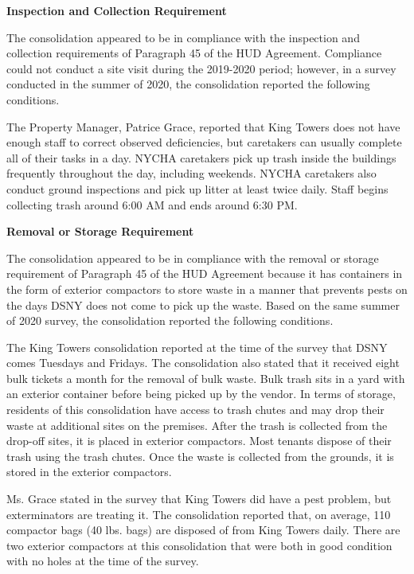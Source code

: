 

\textbf{Inspection and Collection Requirement} 

 

The consolidation appeared to be in compliance with the inspection and collection requirements of Paragraph 45 of the HUD Agreement. Compliance could not conduct a site visit during the 2019-2020 period; however, in a survey conducted in the summer of 2020, the consolidation reported the following conditions.

The Property Manager, Patrice Grace, reported that King Towers does not have enough staff to correct observed deficiencies, but caretakers can usually complete all of their tasks in a day. NYCHA caretakers pick up trash inside the buildings frequently throughout the day, including weekends. NYCHA caretakers also conduct ground inspections and pick up litter at least twice daily. Staff begins collecting trash around 6:00 AM and ends around 6:30 PM.

\textbf{Removal or Storage Requirement} 

The consolidation appeared to be in compliance with the removal or storage requirement of Paragraph  45 of the HUD Agreement because it has containers in the form of exterior compactors to store waste in a manner that prevents pests on the days DSNY does not come to pick up the waste. Based on the same summer of  2020 survey, the consolidation reported the following conditions.  

The King Towers consolidation reported at the time of the survey that DSNY comes Tuesdays and Fridays. The consolidation also stated that it received eight bulk tickets a month for the removal of bulk waste. Bulk trash sits in a yard with an exterior container before being picked up by the vendor. In terms of storage, residents of this consolidation have access to trash chutes and may drop their waste at additional sites on the premises. After the trash is collected from the drop-off sites, it is placed in exterior compactors. Most tenants dispose of their trash using the trash chutes. Once the waste is collected from the grounds, it is stored in the exterior compactors.  

 

Ms. Grace stated in the survey that King Towers did have a pest problem, but exterminators are treating it. The consolidation reported that, on average, 110 compactor bags (40 lbs. bags)  are disposed of from King Towers daily. There are two exterior compactors at this consolidation that were both in good condition with no holes at the time of the survey. 

